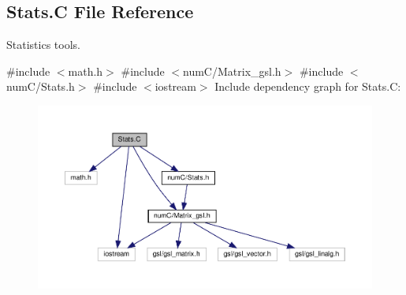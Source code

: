 \hypertarget{Stats_8C}{}\subsection{Stats.\+C File Reference}
\label{Stats_8C}


Statistics tools.  


{\ttfamily \#include $<$math.\+h$>$}\newline
{\ttfamily \#include $<$num\+C/\+Matrix\+\_\+gsl.\+h$>$}\newline
{\ttfamily \#include $<$num\+C/\+Stats.\+h$>$}\newline
{\ttfamily \#include $<$iostream$>$}\newline
Include dependency graph for Stats.\+C\+:
\nopagebreak
\begin{figure}[H]
\begin{center}
\leavevmode
\includegraphics[width=350pt]{Stats_8C__incl}
\end{center}
\end{figure}
